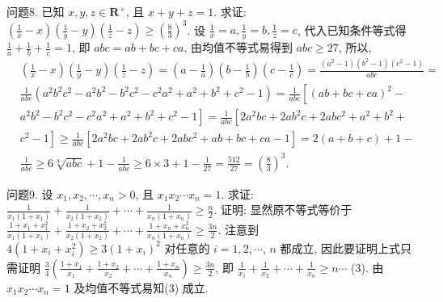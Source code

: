 问题8. 已知 $x, y, z \in \mathbf{R}^{+}$, 且 $x+y+z=1$. 求证: $\left(\frac{1}{x}-x\right)\left(\frac{1}{y}-y\right)\left(\frac{1}{z}-z\right) \geqslant \left(\frac{8}{3}\right)^3$.
设 $\frac{1}{x}=a, \frac{1}{y}=b, \frac{1}{z}=c$, 代入已知条件等式得 $\frac{1}{a}+\frac{1}{b}+\frac{1}{c}=1$, 即 $a b c=a b+b c+c a$, 由均值不等式易得到 $a b c \geqslant 27$, 所以,
$$
\begin{aligned}
& \left(\frac{1}{x}-x\right)\left(\frac{1}{y}-y\right)\left(\frac{1}{z}-z\right)=\left(a-\frac{1}{a}\right)\left(b-\frac{1}{b}\right)\left(c-\frac{1}{c}\right)=\frac{\left(a^2-1\right)\left(b^2-1\right)\left(c^2-1\right)}{a b c}= \\
& \frac{1}{a b c}\left(a^2 b^2 c^2-a^2 b^2-b^2 c^2-c^2 a^2+a^2+b^2+c^2-1\right)=\frac{1}{a b c}\left[(a b+b c+c a)^2-\right. \\
& \left.a^2 b^2-b^2 c^2-c^2 a^2+a^2+b^2+c^2-1\right]=\frac{1}{a b c}\left[2 a^2 b c+2 a b^2 c+2 a b c^2+a^2+b^2+\right. \\
& \left.c^2-1\right] \geqslant \frac{1}{a b c}\left[2 a^2 b c+2 a b^2 c+2 a b c^2+a b+b c+c a-1\right]=2(a+b+c)+1- \\
& \frac{1}{a b c} \geqslant 6 \sqrt[3]{a b c}+1-\frac{1}{a b c} \geqslant 6 \times 3+1-\frac{1}{27}=\frac{512}{27}=\left(\frac{8}{3}\right)^3 .
\end{aligned}
$$



问题9. 设 $x_1, x_2, \cdots, x_n>0$, 且 $x_1 x_2 \cdots x_n=1$. 求证: $\frac{1}{x_1\left(1+x_1\right)}+\frac{1}{x_2\left(1+x_2\right)} +\cdots+\frac{1}{x_n\left(1+x_n\right)} \geqslant \frac{n}{2}$.
证明: 显然原不等式等价于 $\frac{1+x_1+x_1^2}{x_1\left(1+x_1\right)}+\frac{1+x_2+x_2^2}{x_2\left(1+x_2\right)}+\cdots+ \frac{1+x_n+x_n^2}{x_n\left(1+x_n\right)} \geqslant \frac{3 n}{2}$. 注意到 $4\left(1+x_i+x_i^2\right) \geqslant 3\left(1+x_i\right)^2$ 对任意的 $i=1,2, \cdots$, $n$ 都成立, 因此要证明上式只需证明 $\frac{3}{4}\left(\frac{1+x_1}{x_1}+\frac{1+x_2}{x_2}+\cdots+\frac{1+x_n}{x_n}\right) \geqslant \frac{3 n}{2}$, 即 $\frac{1}{x_1}+\frac{1}{x_2}+\cdots+\frac{1}{x_n} \geqslant n \cdots$ (3). 由 $x_1 x_2 \cdots x_n=1$ 及均值不等式易知(3) 成立.



